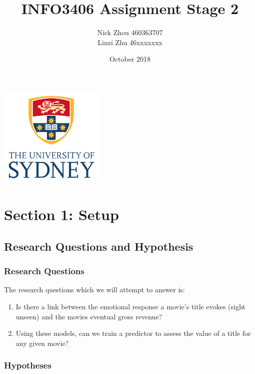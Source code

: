 \documentclass[font=10pt]{article}
\begin{document}
  \begin{titlepage}
    \centering
    \title{\textbf{INFO3406 Assignment Stage 2}}
    \author{
      Nick Zhou 460363707\\
      Linzi Zhu 46xxxxxxx
    }
    \date{October 2018}
    \maketitle
    \includegraphics[width=5cm]{usyd}
  \end{titlepage}

  \begin{tableofcontents}
    \tableofcontents
  \end{tableofcontents}

  \section{Section 1: Setup}
    \subsection{Research Questions and Hypothesis}
      \subsubsection{Research Questions}

      The research questions which we will attempt to answer is:
      \begin{enumerate}
        \item Is there a link between the emotional response a movie’s title evokes (sight unseen) and the movies eventual gross revenue?
        \item Using these models, can we train a predictor to assess the value of a title for any given movie?
      \end{enumerate}

      \subsubsection{Hypotheses}
\end{document}
